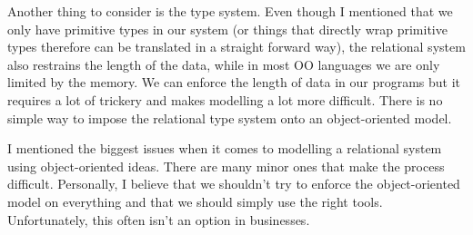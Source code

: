 \documentclass{report}
\begin{document}
Another thing to consider is the type system. Even though I mentioned
that we only have primitive types in our system (or things that
directly wrap primitive types therefore can be translated in a
straight forward way), the relational system also restrains the length
of the data, while in most OO languages we are only limited by the
memory. We can enforce the length of data in our programs but it
requires a lot of trickery and makes modelling a lot more difficult.
There is no simple way to impose the relational type system onto an
object-oriented model.

I mentioned the biggest issues when it comes to modelling a relational
system using object-oriented ideas. There are many minor ones that
make the process difficult. Personally, I believe that we shouldn't
try to enforce the object-oriented model on everything and that we
should simply use the right tools. Unfortunately, this often isn't an
option in businesses.
\end{document}
